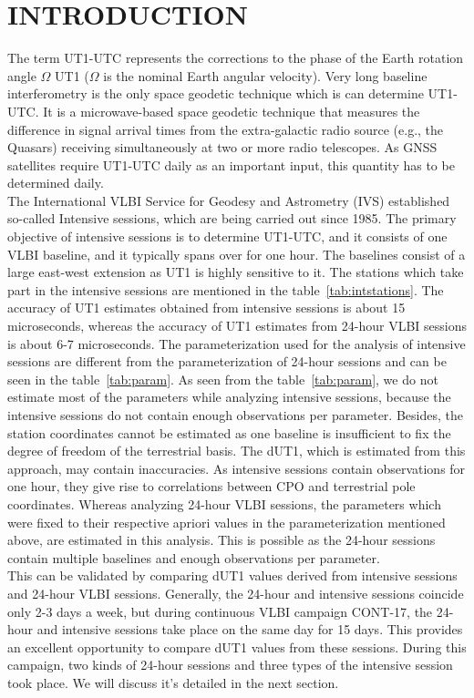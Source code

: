 \documentclass[smallextended]{svjour3}       %
\begin{document}
\section{INTRODUCTION}
\label{intro}
The term UT1-UTC represents the corrections to the phase of the Earth rotation angle $\Omega$ UT1 ($\Omega$ is the nominal Earth angular velocity). Very long baseline interferometry is the only space geodetic technique which is can determine UT1-UTC. It is a microwave-based space geodetic technique that measures the difference in signal arrival times from the extra-galactic radio source (e.g., the Quasars) receiving simultaneously at two or more radio telescopes. As GNSS satellites require UT1-UTC daily as an important input, this quantity has to be determined daily. \\
The International VLBI Service for Geodesy and Astrometry (IVS) established so-called Intensive sessions, which are being carried out since 1985. The primary objective of intensive sessions is to determine UT1-UTC, and it consists of one VLBI baseline, and it typically spans over for one hour. The baselines consist of a large east-west extension as UT1 is highly sensitive to it. The stations which take part in the intensive sessions are mentioned in the table~\ref{tab:intstations}. The accuracy of UT1 estimates obtained from intensive sessions is about 15 microseconds, whereas the accuracy of UT1 estimates from 24-hour VLBI sessions is about 6-7 microseconds. The parameterization used for the analysis of intensive sessions are different from the parameterization of 24-hour sessions and can be seen in the table~\ref{tab:param}. As seen from the table~\ref{tab:param}, we do not estimate most of the parameters while analyzing intensive sessions, because the intensive sessions do not contain enough observations per parameter. Besides, the station coordinates cannot be estimated as one baseline is insufficient to fix the degree of freedom of the terrestrial basis. The dUT1, which is estimated from this approach, may contain inaccuracies. As intensive sessions contain observations for one hour, they give rise to correlations between CPO and terrestrial pole coordinates. Whereas analyzing 24-hour VLBI sessions, the parameters which were fixed to their respective apriori values in the parameterization mentioned above, are estimated in this analysis. This is possible as the 24-hour sessions contain multiple baselines and enough observations per parameter. \\
This can be validated by comparing dUT1 values derived from intensive sessions and 24-hour VLBI sessions. Generally, the 24-hour and intensive sessions coincide only 2-3 days a week, but during continuous VLBI campaign CONT-17, the 24-hour and intensive sessions take place on the same day for 15 days. This provides an excellent opportunity to compare dUT1 values from these sessions. During this campaign, two kinds of 24-hour sessions and three types of the intensive session took place. We will discuss it's detailed in the next section. 
\end{document}
